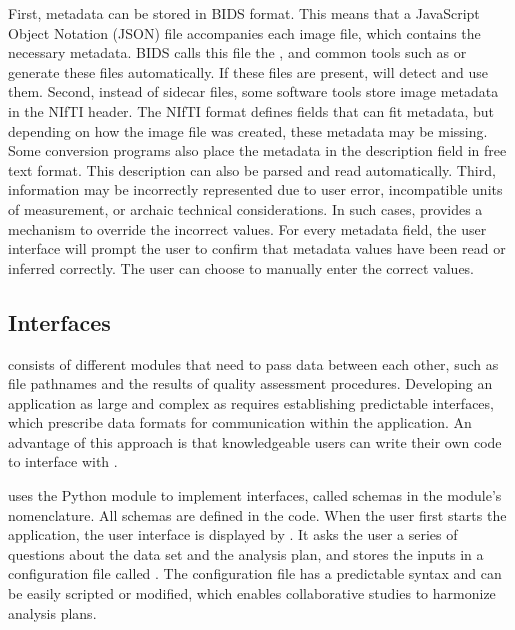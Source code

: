 First, metadata can be stored in BIDS format. This means that a JavaScript
Object Notation (JSON) file accompanies each image file, which contains the
necessary metadata. BIDS calls this file the , and common
tools such as  \parencite{yaroslav_halchenko_2018_1306159} or
 \parencite{10.1016/j.jneumeth.2016.03.001} generate these files
automatically. If these files are present,  will detect and
use them. Second, instead of sidecar files, some software tools store image
metadata in the NIfTI header. The NIfTI format defines fields that can fit
metadata, but depending on how the image file was created, these metadata
may be missing. Some conversion programs also place the metadata in the
description field in free text format. This description can also be parsed
and read automatically. Third, information may be incorrectly represented
due to user error, incompatible units of measurement, or archaic technical
considerations. In such cases,  provides a mechanism to
override the incorrect values. For every metadata field, the user interface
will prompt the user to confirm that metadata values have been read or
inferred correctly. The user can choose to manually enter the correct
values.

\subsection{Interfaces}

 consists of different modules that need to pass data
between each other, such as file pathnames and the results of quality
assessment procedures. Developing an application as large and complex as
 requires establishing predictable interfaces, which
prescribe data formats for communication within the application. An
advantage of this approach is that knowledgeable users can write their own
code to interface with .

 uses the Python module  to implement
interfaces, called schemas in the module's nomenclature. All schemas are
defined in the  code. When the user first starts the
application, the user interface is displayed by . It asks
the user a series of questions about the data set and the analysis plan,
and stores the inputs in a configuration file called . The
configuration file has a predictable syntax and can be easily scripted or
modified, which enables collaborative studies to harmonize analysis plans.
